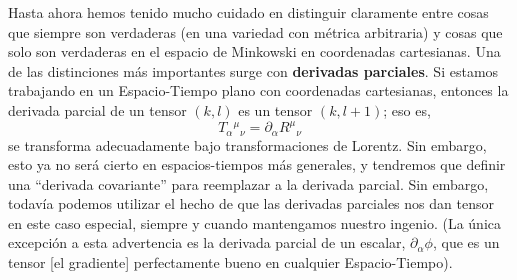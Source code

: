 \documentclass[11pt,b5paper,openany,twoside]{book}
\begin{document}
Hasta ahora hemos tenido mucho cuidado en distinguir claramente entre cosas que siempre son verdaderas (en una variedad con métrica arbitraria) y cosas que solo son verdaderas en el espacio de Minkowski en coordenadas cartesianas.
Una de las distinciones más importantes surge con {\bf derivadas parciales}.
Si estamos trabajando en un Espacio-Tiempo plano con coordenadas cartesianas, entonces la derivada parcial de un tensor $(k,l)$ es un tensor $(k,l+1)$; eso es,
\begin{equation}
T_\alpha{}^\mu{}_\nu = \partial_\alpha R^\mu{}_\nu \label{1.72}
\end{equation}
se transforma adecuadamente bajo transformaciones de Lorentz.
Sin embargo, esto ya no será cierto en espacios-tiempos más generales, y tendremos que definir una ``derivada covariante'' para reemplazar a la derivada parcial.
Sin embargo, todavía podemos utilizar el hecho de que las derivadas parciales nos dan tensor en este caso especial, siempre y cuando mantengamos nuestro ingenio.
(La única excepción a esta advertencia es la derivada parcial de un escalar, $\partial_\alpha\phi$, que es un tensor [el gradiente] perfectamente bueno en cualquier Espacio-Tiempo).
\end{document}
